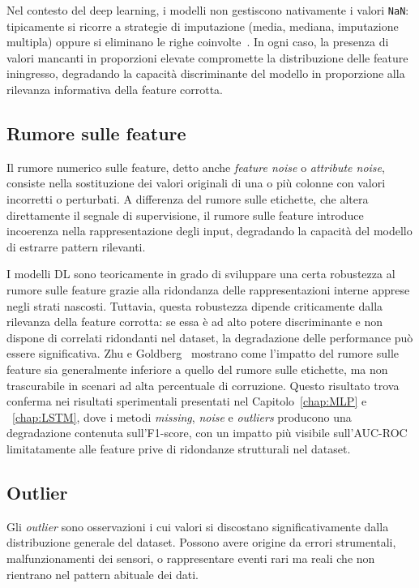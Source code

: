 \documentclass[../main.tex]{subfiles}
\begin{document}
Nel contesto del deep learning, i modelli non gestiscono nativamente i valori \texttt{NaN}: tipicamente si ricorre a strategie di imputazione (media, mediana, imputazione multipla) oppure si eliminano le righe coinvolte~\cite{SUN2023120201}. In ogni caso, la presenza di valori mancanti in proporzioni elevate compromette la distribuzione delle feature iningresso, degradando la capacità discriminante del modello in proporzione alla rilevanza informativa della feature corrotta.

\subsection{Rumore sulle feature}
Il rumore numerico sulle feature, detto anche \textit{feature noise} o \textit{attribute noise}, consiste nella sostituzione dei valori originali di una o più colonne con valori incorretti o perturbati. A differenza del rumore sulle etichette, che altera direttamente il segnale di supervisione, il rumore sulle feature introduce incoerenza nella rappresentazione degli input, degradando la capacità del modello di estrarre pattern rilevanti.

I modelli DL sono teoricamente in grado di sviluppare una certa robustezza al rumore sulle feature grazie alla ridondanza delle rappresentazioni interne apprese negli strati nascosti. Tuttavia, questa robustezza dipende criticamente dalla rilevanza della feature corrotta: se essa è ad alto potere discriminante e non dispone di correlati ridondanti nel dataset, la degradazione delle performance può essere significativa. Zhu e Goldberg~\cite{zhu2004class} mostrano come l'impatto del rumore sulle feature sia generalmente inferiore a quello del rumore sulle etichette, ma non trascurabile in scenari ad alta percentuale di corruzione. Questo risultato trova conferma nei risultati sperimentali presentati nel Capitolo~\ref{chap:MLP} e ~\ref{chap:LSTM}, dove i metodi \textit{missing}, \textit{noise} e \textit{outliers} producono una degradazione contenuta sull'F1-score, con un impatto più visibile sull'AUC-ROC limitatamente alle feature prive di ridondanze strutturali nel dataset.

\subsection{Outlier}
Gli \textit{outlier} sono osservazioni i cui valori si discostano
significativamente dalla distribuzione generale del dataset. Possono avere
origine da errori strumentali, malfunzionamenti dei sensori, o rappresentare
eventi rari ma reali che non rientrano nel pattern abituale dei dati.
\end{document}
